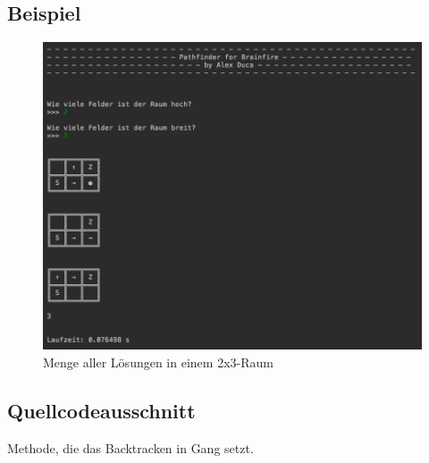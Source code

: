 \documentclass[a4paper,10pt,ngerman]{scrartcl}
\begin{document}
		\newpage
		\subsection{Beispiel}
		
			\begin{figure}[h!]
				\begin{center}
					\includegraphics[width=1\textwidth]{2x3Beispiel.png}
					\caption{Menge aller Lösungen in einem 2x3-Raum}
				\end{center}
			\end{figure}
		
		\subsection{Quellcodeausschnitt}
		
		Methode, die das Backtracken in Gang setzt.
		
\end{document}
